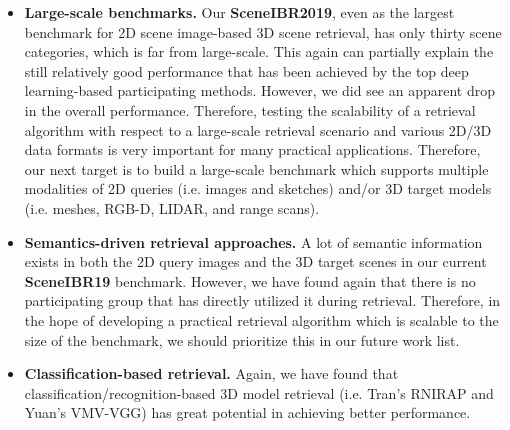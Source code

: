 \documentclass[../main.tex]{subfiles}
\begin{document}
\begin{itemize}
	
	\item \textbf{Large-scale benchmarks.} Our \textbf{SceneIBR2019}, even as 
	the largest benchmark for 2D scene image-based 3D scene retrieval, has only 
	thirty scene categories, which is far from large-scale. This again can 
	partially explain the still relatively good performance that has been 
	achieved by the top deep learning-based participating methods. However, we 
	did see an apparent drop in the overall performance. Therefore, testing the 
	scalability of a retrieval algorithm with respect to a large-scale 
	retrieval scenario and various 2D/3D data formats is very important for 
	many practical applications. Therefore, our next target is to build a 
	large-scale benchmark which supports multiple modalities of 2D queries 
	(i.e. images and sketches) and/or 3D target models (i.e. meshes, RGB-D, 
	LIDAR, and range scans).
	
	\item \textbf{Semantics-driven retrieval approaches.} A lot of semantic information exists in both the 2D query images and the 3D target scenes in our current \textbf{SceneIBR19} benchmark. However, we have found again that there is no participating group that has directly utilized it during retrieval. Therefore, in the hope of developing a practical retrieval algorithm which is scalable to the size of the benchmark, we should prioritize this in our future work list.
	
	\item \textbf{Classification-based retrieval.} Again, we have found that classification/recognition-based 3D model retrieval (i.e. Tran's RNIRAP and Yuan's VMV-VGG) has great potential in achieving better performance.
	
	
\end{itemize}
\end{document}
